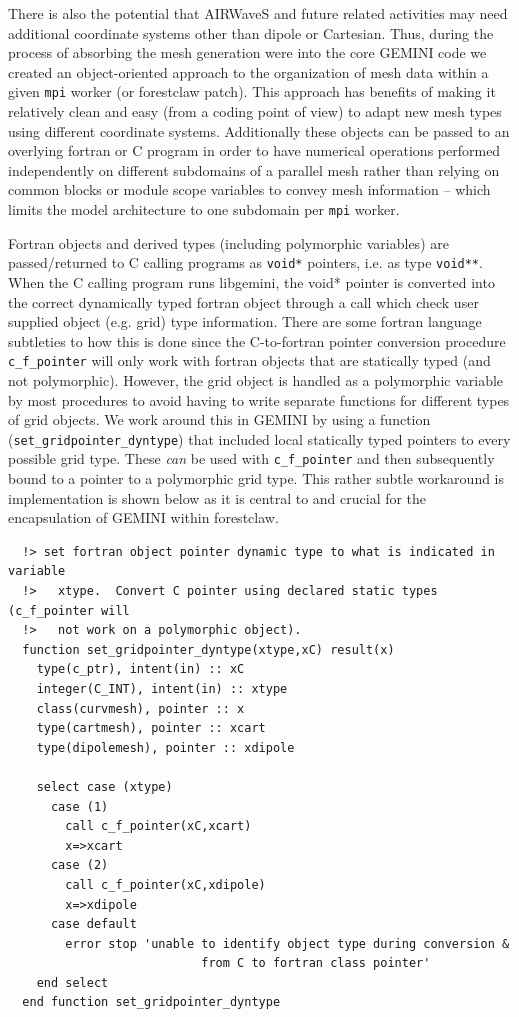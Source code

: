 \documentclass[11pt,letterpaper]{article}
\begin{document}
There is also the potential that AIRWaveS and future related activities may need additional coordinate systems other than dipole or Cartesian.  Thus, during the process of absorbing the mesh generation were into the core GEMINI code we created an object-oriented approach to the organization of mesh data within a given \texttt{mpi} worker (or forestclaw patch).  This approach has benefits of making it relatively clean and easy (from a coding point of view) to adapt new mesh types using different coordinate systems. Additionally these objects can be passed to an overlying fortran or C program in order to have numerical operations performed independently on different subdomains of a parallel mesh rather than relying on common blocks or module scope variables to convey mesh information -- which limits the model architecture to one subdomain per \texttt{mpi} worker.

Fortran objects and derived types (including polymorphic variables) are passed/returned to C calling programs as \texttt{void*} pointers, i.e. as type \texttt{void**}.  When the C calling program runs libgemini, the void* pointer is converted into the correct dynamically typed fortran object through a call which check user supplied object (e.g. grid) type information.  There are some fortran language subtleties to how this is done since the C-to-fortran pointer conversion procedure \texttt{c\_f\_pointer} will only work with fortran objects that are statically typed (and not polymorphic).  However, the grid object is handled as a polymorphic variable by most procedures to avoid having to write separate functions for different types of grid objects.  We work around this in GEMINI by using a function (\texttt{set\_gridpointer\_dyntype}) that included local statically typed pointers to every possible grid type.  These \emph{can} be used with \texttt{c\_f\_pointer} and then subsequently bound to a pointer to a polymorphic grid type.  This rather subtle workaround is implementation is shown below as it is central to and crucial for the encapsulation of GEMINI within forestclaw.  

\begin{verbatim}
  !> set fortran object pointer dynamic type to what is indicated in variable 
  !>   xtype.  Convert C pointer using declared static types (c_f_pointer will 
  !>   not work on a polymorphic object).
  function set_gridpointer_dyntype(xtype,xC) result(x)
    type(c_ptr), intent(in) :: xC
    integer(C_INT), intent(in) :: xtype
    class(curvmesh), pointer :: x
    type(cartmesh), pointer :: xcart
    type(dipolemesh), pointer :: xdipole

    select case (xtype)
      case (1)
        call c_f_pointer(xC,xcart)
        x=>xcart
      case (2)
        call c_f_pointer(xC,xdipole)
        x=>xdipole
      case default
        error stop 'unable to identify object type during conversion &
                           from C to fortran class pointer'
    end select
  end function set_gridpointer_dyntype
\end{verbatim}
\end{document}
